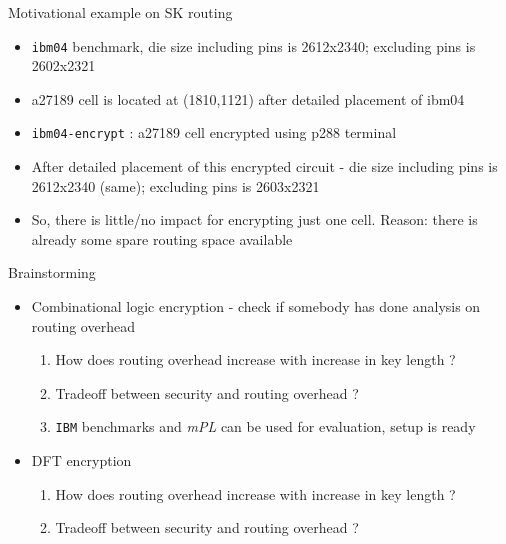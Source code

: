 \begin{frame}{Motivational example on SK routing}
\begin{itemize}
\item \texttt{ibm04} benchmark, die size including pins is 2612x2340; excluding pins is 2602x2321
\item a27189 cell is located at (1810,1121) after detailed placement of ibm04
\item \texttt{ibm04-encrypt} : a27189 cell encrypted using p288 terminal
\item After detailed placement of this encrypted circuit - die size including pins is 2612x2340 (same); excluding pins is 2603x2321
\item So, there is little/no impact for encrypting just one cell. Reason: there is already some spare routing space available
\end{itemize}
\end{frame}

\begin{frame}{Brainstorming}
\begin{itemize}
	\item \alert{Combinational logic encryption - check if somebody has done analysis on routing overhead}
	\begin{enumerate}
		\item How does routing overhead increase with increase in key length ?
		\item Tradeoff between security and routing overhead ?
		\item \texttt{IBM} benchmarks and {\em mPL} can be used for evaluation, setup is ready 
	\end{enumerate}
\item DFT encryption 
	\begin{enumerate}
		\item How does routing overhead increase with increase in key length ?
		\item Tradeoff between security and routing overhead ?
	\end{enumerate}
\end{itemize}
\end{frame}

